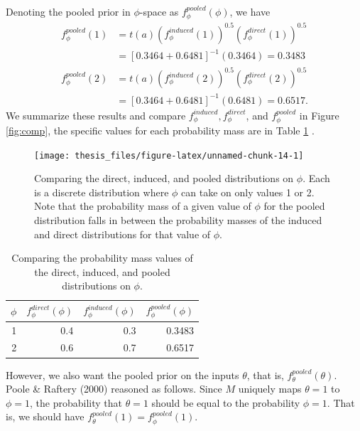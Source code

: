 \documentclass[12pt,twoside]{smiththesis}
\begin{document}
\noindent Denoting the pooled prior in \(\phi\)-space as \(f_\phi^{pooled}(\phi)\), we have
\begin{align*}
f_\phi^{pooled}(1) &= t(a)(f_\phi^{induced}(1))^{0.5} (f_\phi^{direct}(1))^{0.5} \\
&= [0.3464 + 0.6481]^{-1} (0.3464)  = 0.3483\\
f_\phi^{pooled}(2)  &= t(a)(f_\phi^{induced}(2))^{0.5} (f_\phi^{direct}(2))^{0.5} \\
&= [0.3464 + 0.6481]^{-1}   (0.6481) 
=0.6517.
\end{align*}
We summarize these results and compare \(f_\phi^{induced}, f_\phi^{direct}\), and \(f_\phi^{pooled}\) in Figure \ref{fig:comp}, the specific values for each probability mass are in Table \ref{table:table-pooled} .
\begin{figure}

{\centering \texttt{[image: thesis\_files/figure-latex/unnamed-chunk-14-1]} 

}

\caption{\label{fig:comp} Comparing the direct, induced, and pooled distributions on $\phi$. Each is a discrete distribution where $\phi$ can take on only values 1 or 2.  Note that the probability mass of a given value of $\phi$ for the pooled distribution falls in between the probability masses of the induced and direct distributions for that value of $\phi$.}\label{fig:unnamed-chunk-14}
\end{figure}
\begin{table}[H]

\caption{\label{tab:unnamed-chunk-15}\label{table:table-pooled} Comparing the probability mass values of the direct, induced, and pooled distributions on $\phi$.}
\centering
\begin{tabular}[t]{r|r|r|r}
\hline
$\phi$ & $f_\phi^{direct}(\phi)$ & $f_\phi^{induced}(\phi)$ & $f_\phi^{pooled}(\phi)$\\
\hline
1 & 0.4 & 0.3 & 0.3483\\
\hline
2 & 0.6 & 0.7 & 0.6517\\
\hline
\end{tabular}
\end{table}
However, we also want the pooled prior on the inputs \(\theta\), that is, \(f_\theta^{pooled}(\theta)\). Poole \& Raftery (2000) reasoned as follows. Since \(M\) uniquely maps \(\theta=1\) to \(\phi =1\), the probability that \(\theta=1\) should be equal to the probability \(\phi = 1\). That is, we should have \(f_\theta^{pooled}(1) = f_\phi^{pooled}(1)\).
\end{document}
